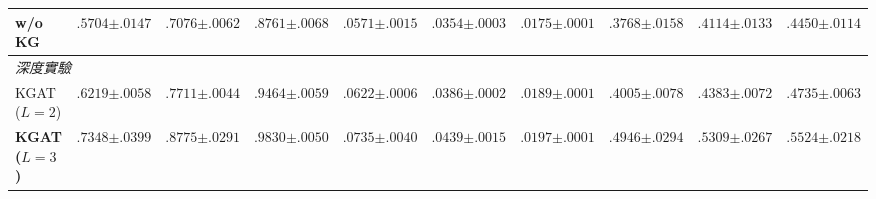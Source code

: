 \begin{table}[htbp]
{\begin{tabular}{l ccc ccc ccc}
    w/o KG & $.5704{\scriptstyle\pm.0147}$ & $.7076{\scriptstyle\pm.0062}$ & $.8761{\scriptstyle\pm.0068}$ & $.0571{\scriptstyle\pm.0015}$ & $.0354{\scriptstyle\pm.0003}$ & $.0175{\scriptstyle\pm.0001}$ & $.3768{\scriptstyle\pm.0158}$ & $.4114{\scriptstyle\pm.0133}$ & $.4450{\scriptstyle\pm.0114}$ \\
    \midrule
    \multicolumn{10}{l}{\textit{深度實驗}} \\
    KGAT ($L{=}2$) & $.6219{\scriptstyle\pm.0058}$ & $.7711{\scriptstyle\pm.0044}$ & $.9464{\scriptstyle\pm.0059}$ & $.0622{\scriptstyle\pm.0006}$ & $.0386{\scriptstyle\pm.0002}$ & $.0189{\scriptstyle\pm.0001}$ & $.4005{\scriptstyle\pm.0078}$ & $.4383{\scriptstyle\pm.0072}$ & $.4735{\scriptstyle\pm.0063}$ \\
    \textbf{KGAT ($L{=}3$)} & $\mathbf{.7348{\scriptstyle\pm.0399}}$ & $\mathbf{.8775{\scriptstyle\pm.0291}}$ & $\mathbf{.9830{\scriptstyle\pm.0050}}$ & $\mathbf{.0735{\scriptstyle\pm.0040}}$ & $\mathbf{.0439{\scriptstyle\pm.0015}}$ & $\mathbf{.0197{\scriptstyle\pm.0001}}$ & $\mathbf{.4946{\scriptstyle\pm.0294}}$ & $\mathbf{.5309{\scriptstyle\pm.0267}}$ & $\mathbf{.5524{\scriptstyle\pm.0218}}$ \\
    \bottomrule
  \end{tabular}%
  }
\end{table}
